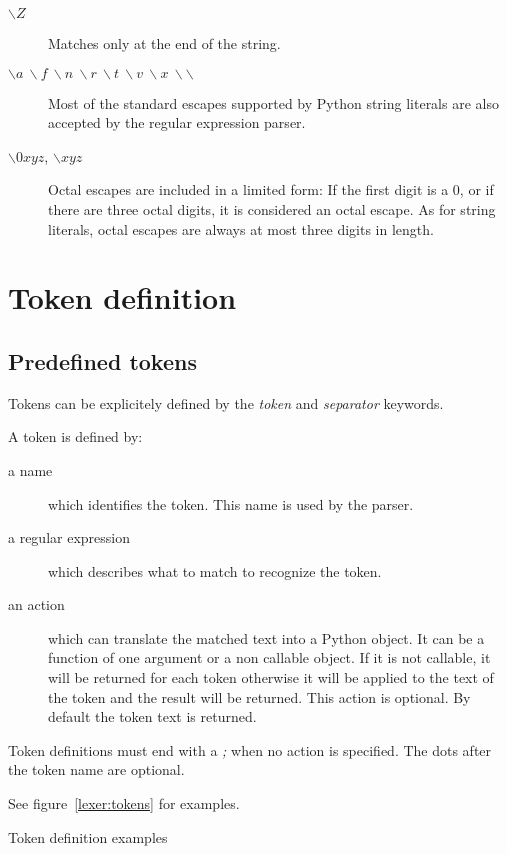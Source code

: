 \begin{description}
    \item [$\backslash Z$]
    Matches only at the end of the string.
    \item [$\backslash a ~ \backslash f ~ \backslash n ~ \backslash r ~ \backslash t ~ \backslash v ~ \backslash x ~ \backslash\backslash$]
    Most of the standard escapes supported by Python string literals are also accepted by the regular expression parser.
    \item [$\backslash 0xyz$, $\backslash xyz$] Octal escapes are included in a limited form: If the first digit is a 0, or if there are three octal digits, it is considered an octal escape. As for string literals, octal escapes are always at most three digits in length.
\end{description}

\section{Token definition}                                  \label{lexer:token_def}

\subsection{Predefined tokens}

Tokens can be explicitely defined by the \emph{token} and \emph{separator} keywords.

A token is defined by:

\begin{description}
    \item [a name] which identifies the token.
        This name is used by the parser.
    \item [a regular expression] which describes what to match to recognize the token.
    \item [an action] which can translate the matched text into a Python object. It can be a function of one argument or a non callable object. If it is not callable, it will be returned for each token otherwise it will be applied to the text of the token and the result will be returned. This action is optional. By default the token text is returned.
\end{description}

Token definitions must end with a \emph{;} when no action is specified. The dots after the token name are optional.

See figure~\ref{lexer:tokens} for examples.

\begin{code}
\caption{Token definition examples}                         \label{lexer:tokens}
\end{code}

